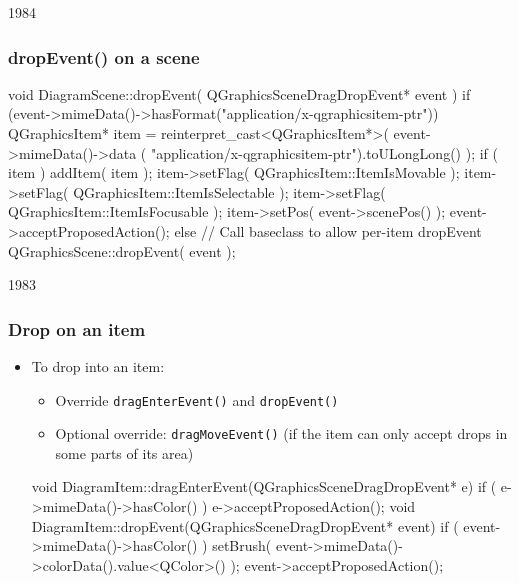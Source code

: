 \begin{slide}[fragile]{1984}


\frametitle{dropEvent() on a scene}
\begin{cpp}
void DiagramScene::dropEvent( QGraphicsSceneDragDropEvent* event ) {
    if (event->mimeData()->hasFormat("application/x-qgraphicsitem-ptr")) {
         QGraphicsItem* item = reinterpret_cast<QGraphicsItem*>(
              event->mimeData()->data (
              "application/x-qgraphicsitem-ptr").toULongLong() );
         if ( item ) {
             addItem( item );
             item->setFlag( QGraphicsItem::ItemIsMovable );
             item->setFlag( QGraphicsItem::ItemIsSelectable );
             item->setFlag( QGraphicsItem::ItemIsFocusable );
             item->setPos( event->scenePos() );
             event->acceptProposedAction();
         }
    } else
        // Call baseclass to allow per-item dropEvent
        QGraphicsScene::dropEvent( event );
}
\end{cpp}
\end{slide}


\begin{slide}[fragile]{1983}


\frametitle{Drop on an item}
\begin{itemize}
\item To drop into an item:
    \begin{itemize}
    \item Override \texttt{dragEnterEvent()} and \texttt{dropEvent()}
    \item Optional override: \texttt{dragMoveEvent()} 
       (if the item can only accept drops in some parts of its area)
    \end{itemize}

\begin{cpp}
void DiagramItem::dragEnterEvent(QGraphicsSceneDragDropEvent* e) {
    if ( e->mimeData()->hasColor() )
        e->acceptProposedAction();
}
void DiagramItem::dropEvent(QGraphicsSceneDragDropEvent* event) {
    if ( event->mimeData()->hasColor() ) {
        setBrush( event->mimeData()->colorData().value<QColor>() );
        event->acceptProposedAction();
    }
}
\end{cpp}
\end{itemize}
\end{slide}


